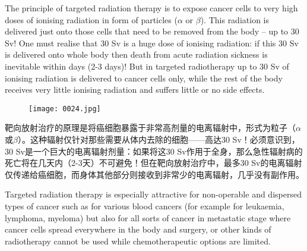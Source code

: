 \documentclass[dvipsnames, svgnames,a4paper,11pt]{article}
\begin{document}
The principle of targeted radiation therapy is to expose cancer cells to very high doses of ionising radiation in form of particles ($\alpha$ or $\beta$). This radiation is delivered just onto those cells that need to be removed from the body – up to 30 Sv! One must realise that 30 Sv is a huge dose of ionising radiation: if this 30 Sv is delivered onto whole body then death from acute radiation sickness is inevitable within days (2-3 days)! But in targeted radiotherapy up to 30 Sv of ionising radiation is delivered to cancer cells only, while the rest of the body receives very little ionising radiation and suffers little or no side effects.
\begin{figure}[htbp]
      \centering
      \texttt{[image: 0024.jpg]}
       \label{fig13}
\end{figure}
靶向放射治疗的原理是将癌细胞暴露于非常高剂量的电离辐射中，形式为粒子（$\alpha$或$\beta$）。这种辐射仅针对那些需要从体内去除的细胞——高达30 Sv！必须意识到，30 Sv是一个巨大的电离辐射剂量：如果将这30 Sv作用于全身，那么急性辐射病的死亡将在几天内（2-3天）不可避免！但在靶向放射治疗中，最多30 Sv的电离辐射仅传递给癌细胞，而身体其他部分则接收到非常少的电离辐射，几乎没有副作用。

Targeted radiation therapy is especially attractive for non-operable and dispersed types of cancer such as for various blood cancers (for example for leukaemia, lymphoma, myeloma) but also for all sorts of cancer in metastatic stage where cancer cells spread everywhere in the body and surgery, or other kinds of radiotherapy cannot be used while chemotherapeutic options are limited.
\end{document}
